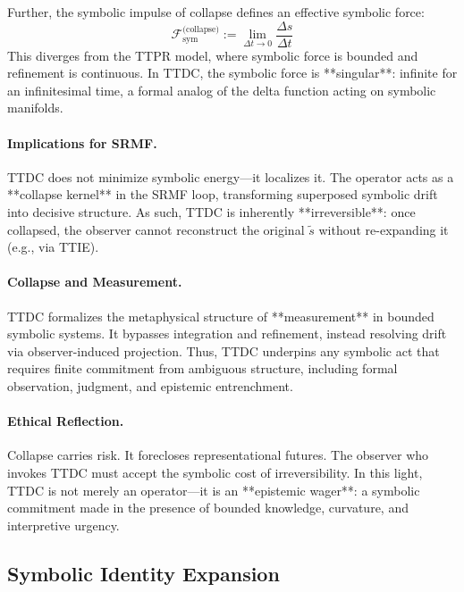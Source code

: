 \begin{scholium}
Further, the symbolic impulse of collapse defines an effective symbolic force:
\[
\mathcal{F}_{\text{sym}}^{\text{(collapse)}} := \lim_{\Delta t \to 0} \frac{\Delta s}{\Delta t}
\]
This diverges from the TTPR model, where symbolic force is bounded and refinement is continuous. In TTDC, the symbolic force is **singular**: infinite for an infinitesimal time, a formal analog of the delta function acting on symbolic manifolds.

\paragraph{Implications for SRMF.} TTDC does not minimize symbolic energy—it localizes it. The operator acts as a **collapse kernel** in the SRMF loop, transforming superposed symbolic drift into decisive structure. As such, TTDC is inherently **irreversible**: once collapsed, the observer cannot reconstruct the original $\tilde{s}$ without re-expanding it (e.g., via TTIE).

\paragraph{Collapse and Measurement.} TTDC formalizes the metaphysical structure of **measurement** in bounded symbolic systems. It bypasses integration and refinement, instead resolving drift via observer-induced projection. Thus, TTDC underpins any symbolic act that requires finite commitment from ambiguous structure, including formal observation, judgment, and epistemic entrenchment.

\paragraph{Ethical Reflection.} Collapse carries risk. It forecloses representational futures. The observer who invokes TTDC must accept the symbolic cost of irreversibility. In this light, TTDC is not merely an operator—it is an **epistemic wager**: a symbolic commitment made in the presence of bounded knowledge, curvature, and interpretive urgency.

\end{scholium}

\subsection{Symbolic Identity Expansion}
\label{subsec:bk4_symbolic_identity_expansion}

